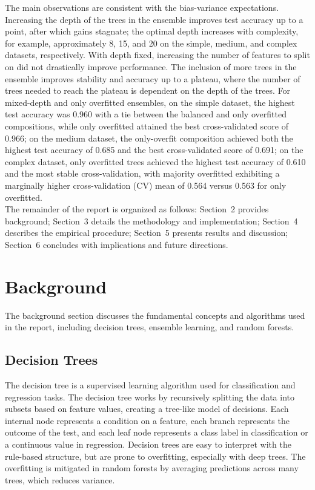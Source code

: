 \documentclass[conference]{IEEEtran}
\begin{document}
The main observations are consistent with the bias-variance expectations. Increasing the depth of the trees in the ensemble improves test accuracy up to a point, after which gains stagnate; the optimal depth increases with complexity, for example, approximately 8, 15, and 20 on the simple, medium, and complex datasets, respectively. With depth fixed, increasing the number of features to split on did not drastically improve performance. The inclusion of more trees in the ensemble improves stability and accuracy up to a plateau, where the number of trees needed to reach the plateau is dependent on the depth of the trees. For mixed-depth and only overfitted ensembles, on the simple dataset, the highest test accuracy was 0.960 with a tie between the balanced and only overfitted compositions, while only overfitted attained the best cross-validated score of 0.966; on the medium dataset, the only-overfit composition achieved both the highest test accuracy of 0.685 and the best cross-validated score of 0.691; on the complex dataset, only overfitted trees achieved the highest test accuracy of 0.610 and the most stable cross-validation, with majority overfitted exhibiting a marginally higher cross-validation (CV) mean of 0.564 versus 0.563 for only overfitted.\\

The remainder of the report is organized as follows: Section~2 provides background; Section~3 details the methodology and implementation; Section~4 describes the empirical procedure; Section~5 presents results and discussion; Section~6 concludes with implications and future directions.

\section{Background}
The background section discusses the fundamental concepts and algorithms used in the report, including decision trees, ensemble learning, and 
random forests.

\subsection{Decision Trees}
The decision tree is a supervised learning algorithm used for classification and regression tasks. The decision tree works by recursively 
splitting the data into subsets based on feature values, creating a tree-like model of decisions. Each internal node represents a condition on a 
feature, each branch represents the outcome of the test, and each leaf node represents a class label in classification or a continuous value 
in regression. Decision trees are easy to interpret with the rule-based structure, but are prone to overfitting, especially with deep trees. The overfitting is 
mitigated in random forests by averaging predictions across many trees, which reduces variance.
\end{document}
